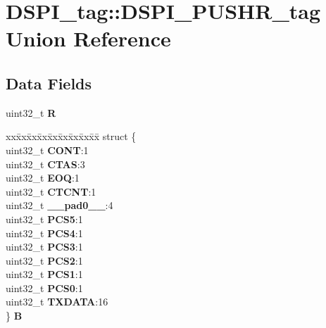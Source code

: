 \hypertarget{unionDSPI__tag_1_1DSPI__PUSHR__tag}{}\section{D\+S\+P\+I\+\_\+tag\+::D\+S\+P\+I\+\_\+\+P\+U\+S\+H\+R\+\_\+tag Union Reference}
\label{unionDSPI__tag_1_1DSPI__PUSHR__tag}
\subsection*{Data Fields}
\begin{DoxyCompactItemize}
\item 
\mbox{\label{unionDSPI__tag_1_1DSPI__PUSHR__tag_aa817e5aeb57b77f78d5c28a7b40565c8}} 
uint32\+\_\+t {\bfseries R}
\item 
\mbox{\label{unionDSPI__tag_1_1DSPI__PUSHR__tag_a7c7e54865e6ee5415616eb38b29ace30}} 
\begin{tabbing}
xx\=xx\=xx\=xx\=xx\=xx\=xx\=xx\=xx\=\kill
struct \{\\
\>uint32\_t {\bfseries CONT}:1\\
\>uint32\_t {\bfseries CTAS}:3\\
\>uint32\_t {\bfseries EOQ}:1\\
\>uint32\_t {\bfseries CTCNT}:1\\
\>uint32\_t {\bfseries \_\_pad0\_\_}:4\\
\>uint32\_t {\bfseries PCS5}:1\\
\>uint32\_t {\bfseries PCS4}:1\\
\>uint32\_t {\bfseries PCS3}:1\\
\>uint32\_t {\bfseries PCS2}:1\\
\>uint32\_t {\bfseries PCS1}:1\\
\>uint32\_t {\bfseries PCS0}:1\\
\>uint32\_t {\bfseries TXDATA}:16\\
\} {\bfseries B}\\


\end{tabbing}
\end{DoxyCompactItemize}
